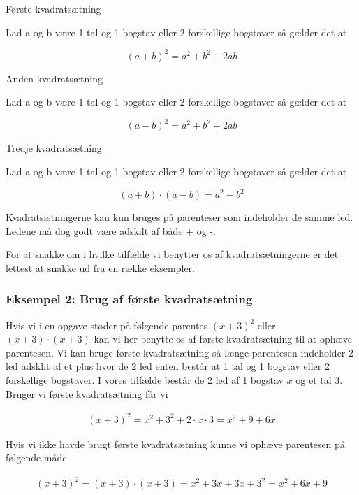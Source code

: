 \begin{frm-thm}{Første kvadratsætning}

Lad a og b være 1 tal og 1 bogstav eller 2 forskellige bogstaver så gælder det at

\[(a + b)^2 = a^2 + b^2 + 2ab\]
\end{frm-thm}

\begin{frm-thm}{Anden kvadratsætning}

Lad a og b være 1 tal og 1 bogstav eller 2 forskellige bogstaver så gælder det at

\[(a - b)^2 = a^2 + b^2 - 2ab\]
\end{frm-thm}

\begin{frm-thm}{Tredje kvadratsætning}

Lad a og b være 1 tal og 1 bogstav eller 2 forskellige bogstaver så gælder det at

\[(a + b)\cdot (a - b) = a^2 - b^2\]
\end{frm-thm}

Kvadratsætningerne kan kun bruges på parenteser som indeholder de samme led. Ledene må dog godt være adskilt af både + og -.

For at snakke om i hvilke tilfælde vi benytter os af kvadratsætningerne er det lettest at snakke ud fra en række eksempler.

\subsubsection*{Eksempel 2: Brug af første kvadratsætning}
Hvis vi i en opgave støder på følgende parentes $(x + 3)^2$ eller $(x+3)\cdot (x+3)$ kan vi her benytte os af første kvadratsætning til at ophæve parentesen. Vi kan bruge første kvadratsætning så længe parentesen indeholder 2 led adsklit af et plus hvor de 2 led enten består at 1 tal og 1 bogstav eller 2 forskellige bogstaver. I vores tilfælde består de 2 led af 1 bogstav $x$ og et tal $3$. Bruger vi første kvadratsætning får vi

\begin{align*}
(x + 3)^2 = x^2 + 3^2 + 2\cdot x\cdot 3 = x^2 + 9 + 6x
\end{align*}

Hvis vi ikke havde brugt første kvadratsætning kunne vi ophæve parentesen på følgende måde

\begin{align*}
(x + 3)^2 = (x + 3) \cdot (x + 3) = x^2 + 3x + 3x + 3^2 = x^2 + 6x + 9
\end{align*}

